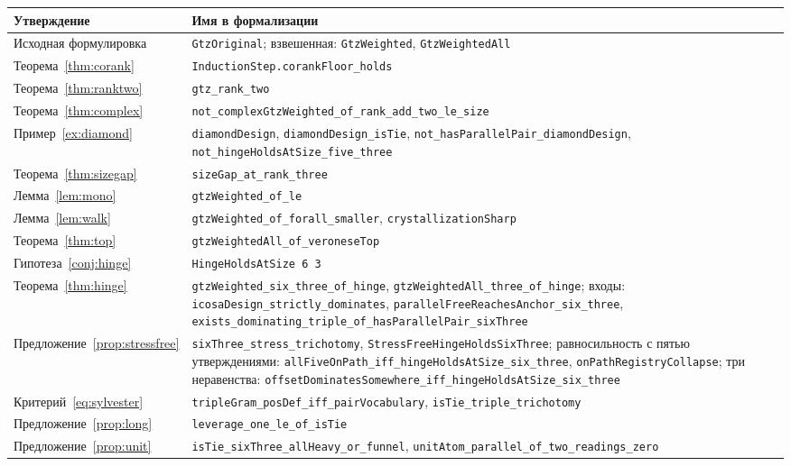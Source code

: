 \documentclass[11pt,a4paper]{article}
\theoremstyle{plain}
\theoremstyle{definition}
\theoremstyle{remark}
\newcommand{\code}[1]{\texttt{\small #1}}
\begin{document}
\begin{longtable}{@{}>{\raggedright\arraybackslash}p{}>{\raggedright\arraybackslash}p{}@{}}
\textbf{Утверждение} & \textbf{Имя в формализации}\\
\hline
\endhead
Исходная формулировка & \code{GtzOriginal}; взвешенная: \code{GtzWeighted},
  \code{GtzWeightedAll}\\
Теорема~\ref{thm:corank} & \code{InductionStep.corankFloor\_holds}\\
Теорема~\ref{thm:ranktwo} & \code{gtz\_rank\_two}\\
Теорема~\ref{thm:complex} & \code{not\_complexGtzWeighted\_of\_rank\_add\_two\_le\_size}\\
Пример~\ref{ex:diamond} & \code{diamondDesign}, \code{diamondDesign\_isTie},
  \code{not\_hasParallelPair\_diamondDesign}, \code{not\_hingeHoldsAtSize\_five\_three}\\
Теорема~\ref{thm:sizegap} & \code{sizeGap\_at\_rank\_three}\\
Лемма~\ref{lem:mono} & \code{gtzWeighted\_of\_le}\\
Лемма~\ref{lem:walk} & \code{gtzWeighted\_of\_forall\_smaller},
  \code{crystallizationSharp}\\
Теорема~\ref{thm:top} & \code{gtzWeightedAll\_of\_veroneseTop}\\
Гипотеза~\ref{conj:hinge} & \code{HingeHoldsAtSize 6 3}\\
Теорема~\ref{thm:hinge} & \code{gtzWeighted\_six\_three\_of\_hinge},
  \code{gtzWeightedAll\_three\_of\_hinge}; входы:
  \code{icosaDesign\_strictly\_dominates},
  \code{parallelFreeReachesAnchor\_six\_three},
  \code{exists\_dominating\_triple\_of\_hasParallelPair\_sixThree}\\
Предложение~\ref{prop:stressfree} & \code{sixThree\_stress\_trichotomy},
  \code{StressFreeHingeHoldsSixThree}; равносильность с пятью утверждениями:
  \code{allFiveOnPath\_iff\_hingeHoldsAtSize\_six\_three},
  \code{onPathRegistryCollapse}; три неравенства:
  \code{offsetDominatesSomewhere\_iff\_hingeHoldsAtSize\_six\_three}\\
Критерий~\eqref{eq:sylvester} & \code{tripleGram\_posDef\_iff\_pairVocabulary},
  \code{isTie\_triple\_trichotomy}\\
Предложение~\ref{prop:long} & \code{leverage\_one\_le\_of\_isTie}\\
Предложение~\ref{prop:unit} & \code{isTie\_sixThree\_allHeavy\_or\_funnel},
  \code{unitAtom\_parallel\_of\_two\_readings\_zero}\\

\end{longtable}
\end{document}
